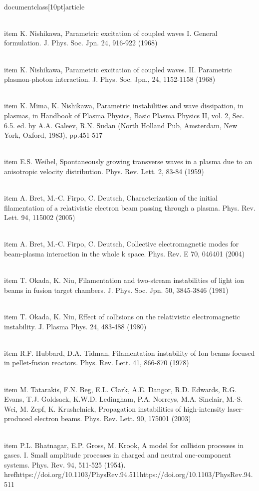 \\documentclass[10pt]{article}
\begin{document}
{{{{  \\item K. Nishikawa, Parametric excitation of coupled waves I. General formulation. J. Phys. Soc. Jpn. 24, 916-922 (1968)

  \\item K. Nishikawa, Parametric excitation of coupled waves. II. Parametric plasmon-photon interaction. J. Phys. Soc. Jpn., 24, 1152-1158 (1968)

  \\item K. Mima, K. Nishikawa, Parametric instabilities and wave dissipation, in plasmas, in Handbook of Plasma Physics, Basic Plasma Physics II, vol. 2, Sec. 6.5. ed. by A.A. Galeev, R.N. Sudan (North Holland Pub, Amsterdam, New York, Oxford, 1983), pp.451-517

  \\item E.S. Weibel, Spontaneously growing transverse waves in a plasma due to an anisotropic velocity distribution. Phys. Rev. Lett. 2, 83-84 (1959)

  \\item A. Bret, M.-C. Firpo, C. Deutsch, Characterization of the initial filamentation of a relativistic electron beam passing through a plasma. Phys. Rev. Lett. 94, 115002 (2005)

  \\item A. Bret, M.-C. Firpo, C. Deutsch, Collective electromagnetic modes for beam-plasma interaction in the whole k space. Phys. Rev. E 70, 046401 (2004)

  \\item T. Okada, K. Niu, Filamentation and two-stream instabilities of light ion beams in fusion target chambers. J. Phys. Soc. Jpn. 50, 3845-3846 (1981)

  \\item T. Okada, K. Niu, Effect of collisions on the relativistic electromagnetic instability. J. Plasma Phys. 24, 483-488 (1980)

  \\item R.F. Hubbard, D.A. Tidman, Filamentation instability of Ion beams focused in pellet-fusion reactors. Phys. Rev. Lett. 41, 866-870 (1978)

  \\item M. Tatarakis, F.N. Beg, E.L. Clark, A.E. Dangor, R.D. Edwards, R.G. Evans, T.J. Goldsack, K.W.D. Ledingham, P.A. Norreys, M.A. Sinclair, M.-S. Wei, M. Zepf, K. Krushelnick, Propagation instabilities of high-intensity laser-produced electron beams. Phys. Rev. Lett. 90, 175001 (2003)

  \\item P.L. Bhatnagar, E.P. Gross, M. Krook, A model for collision processes in gases. I. Small amplitude processes in charged and neutral one-component systems. Phys. Rev. 94, 511-525 (1954). \\href{https://doi.org/10.1103/PhysRev.94.511}{https://doi.org/10.1103/PhysRev.94.511}

}}}}
\end{document}

